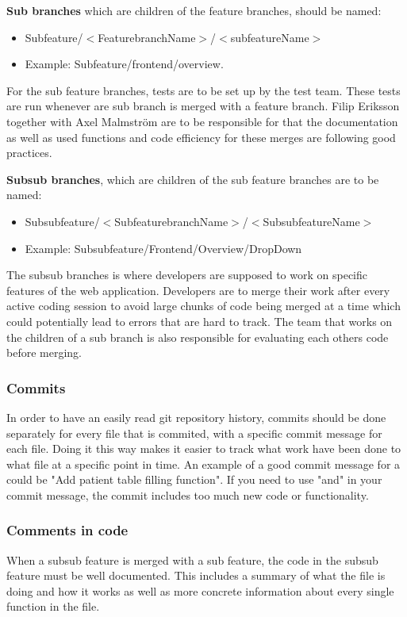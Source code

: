 \textbf{Sub branches} which are children of the feature branches, should be named: 
\begin{itemize}
    \item Subfeature/$<$FeaturebranchName$>$/$<$subfeatureName$>$
    \item Example: Subfeature/frontend/overview.

\end{itemize}

For the sub feature branches, tests are to be set up by the test team. These tests are run whenever are sub branch is merged with a feature branch. Filip Eriksson together with Axel Malmström are to be responsible for that the documentation as well as used functions and code efficiency for these merges are following good practices.

\textbf{Subsub branches}, which are children of the sub feature branches are to be named: 
\begin{itemize}
    \item Subsubfeature/$<$SubfeaturebranchName$>$/$<$SubsubfeatureName$>$
    \item Example: Subsubfeature/Frontend/Overview/DropDown
\end{itemize}


The subsub branches is where developers are supposed to work on specific features of the web application. Developers are to merge their work after every active coding session to avoid large chunks of code being merged at a time which could potentially lead to errors that are hard to track. The team that works on the children of a sub branch is also responsible for evaluating each others code before merging. 


\subsubsection{Commits}
In order to have an easily read git repository history, commits should be done separately for every file that is commited, with a specific commit message for each file. Doing it this way makes it easier to track what work have been done to what file at a specific point in time. An example of a good commit message for a could be "Add patient table filling function". If you need to use "and" in your commit message, the commit includes too much new code or functionality.

\subsubsection{Comments in code}
When a subsub feature is merged with a sub feature, the code in the subsub feature must be well documented. This includes a summary of what the file is doing and how it works as well as more concrete information about every single function in the file. 

